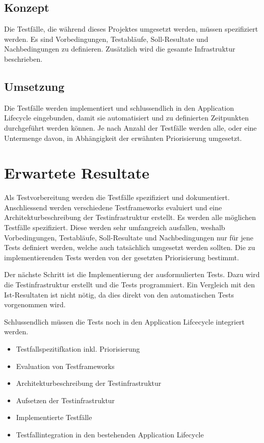 \subsection{Konzept}
Die Testfälle, die während dieses Projektes umgesetzt werden, müssen spezifiziert werden. Es sind Vorbedingungen, Testabläufe, Soll-Resultate und Nachbedingungen zu definieren. Zusätzlich wird die gesamte Infrastruktur beschrieben.

\subsection{Umsetzung}
Die Testfälle werden implementiert und schlussendlich in den Application Lifecycle eingebunden, damit sie automatisiert und zu definierten Zeitpunkten durchgeführt werden können.
Je nach Anzahl der Testfälle werden alle, oder eine Untermenge davon, in Abhängigkeit der erwähnten Priorisierung umgesetzt.

\section{Erwartete Resultate}
Als Testvorbereitung werden die Testfälle spezifiziert und dokumentiert. Anschliessend werden verschiedene Testframeworks evaluiert und eine Architekturbeschreibung der Testinfrastruktur erstellt.
Es werden alle möglichen Testfälle spezifiziert. Diese werden sehr umfangreich ausfallen, weshalb Vorbedingungen, Testabläufe, Soll-Resultate und Nachbedingungen nur für jene Tests definiert werden, welche auch tatsächlich umgesetzt werden sollten. Die zu implementierenden Tests werden von der gesetzten Priorisierung bestimmt.

Der nächste Schritt ist die Implementierung der ausformulierten Tests. Dazu wird die Testinfrastruktur erstellt und die Tests programmiert. Ein Vergleich mit den Ist-Resultaten ist nicht nötig, da dies direkt von den automatischen Tests vorgenommen wird.

Schlussendlich müssen die Tests noch in den Application Lifcecycle integriert werden.

\begin{itemize}
\item Testfallspezitifkation inkl. Priorisierung
\item Evaluation von Testframeworks
\item Architekturbeschreibung der Testinfrastruktur
\item Aufsetzen der Testinfrastruktur
\item Implementierte Testfälle
\item Testfallintegration in den bestehenden Application Lifecycle
\end{itemize}